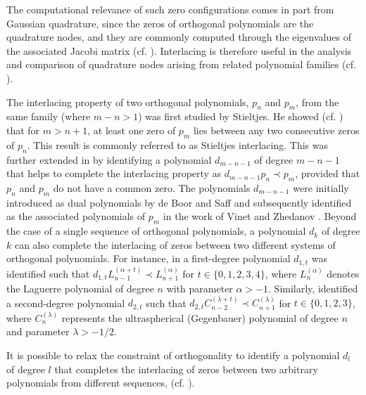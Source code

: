 \documentclass[final,3p,times,12pt]{elsarticle}
\numberwithin{equation}{section}  %
\begin{document}
	The computational relevance of such zero configurations comes in part from Gaussian quadrature, since the zeros of orthogonal polynomials are the quadrature nodes, and they are commonly computed through the eigenvalues of the associated Jacobi matrix (cf. \cite{GolubWelsch1969,Gautschi2004Book}). Interlacing is therefore useful in the analysis and comparison of quadrature nodes arising from related polynomial families (cf. \cite{DriverJordaanMbuyi2009}). 
	
	The interlacing property of two orthogonal polynomials, $p_n$ and $p_m$, from the same family (where $m - n > 1$) was first studied by Stieltjes. He showed  (cf. \cite[page 46]{Szego-OP-Book}) that for $m > n + 1$, at least one zero of $p_m$ lies between any two consecutive zeros of $p_n$. This result is commonly referred to as Stieltjes interlacing.  This was further extended  in \cite{Beardon-Extension-Stieljtes-CMFT-2011,Boor-Saff-StieltjesExtension-LAA-1986} by identifying a polynomial $d_{m-n-1}$ of degree $m-n-1$ that helps to complete the interlacing property as $d_{m-n-1} p_n \prec p_m$, provided that $p_n$ and $p_m$ do not have a common zero.  The polynomials $d_{m-n-1}$ were initially introduced as dual polynomials by de Boor and Saff \cite{Boor-Saff-StieltjesExtension-LAA-1986} and subsequently identified as the associated polynomials of  $p_m$ in the work of Vinet and Zhedanov \cite{Vinet-Zhedanov-JCAM-2004}. Beyond the case of a single sequence of orthogonal polynomials, a polynomial $d_k$ of degree $k$ can also complete the interlacing of zeros between two different systems of orthogonal polynomials. For instance, in \cite{Driver-Jordaan-IndagMath-2011} a first-degree polynomial $d_{1,t}$ was identified such that $d_{1,t} L_{n-1}^{(\alpha+t)} \prec L_{n+1}^{(\alpha)}$ for $t \in \{0, 1, 2, 3, 4\}$, where $L_n^{(\alpha)}$ denotes the Laguerre polynomial of degree $n$ with parameter $\alpha > -1$. Similarly, \cite{Driver-NumerMath-2012} identified a second-degree polynomial $d_{2,t}$ such that $d_{2,t} C_{n-2}^{(\lambda+t)} \prec C_{n+1}^{(\lambda)}$ for $t \in \{0, 1, 2, 3\}$, where $C_n^{(\lambda)}$ represents the ultraspherical (Gegenbauer) polynomial of degree $n$ and parameter $\lambda > -1/2$. 
	
	It is possible to relax the constraint of orthogonality to identify a polynomial $d_l$ of degree $l$ that completes the interlacing of zeros between two arbitrary polynomials from different sequences, (cf.  \cite{Driver-Jordaan-JAT-2012,Jooste-Jordaan-Numeralg-2025,Jordaan-Kumar-onepoint-2026}).   %
	
\end{document}

